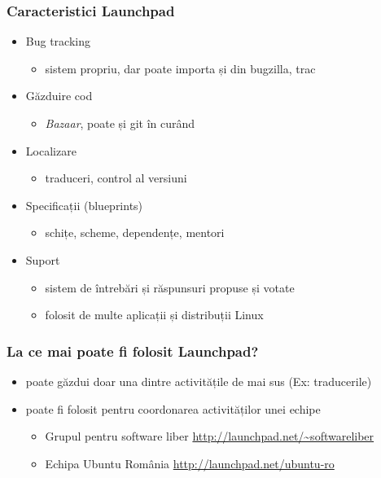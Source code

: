 \documentclass{beamer}
\begin{document}
\begin{frame}
\frametitle{Caracteristici Launchpad}
\begin{itemize}
\pause \item Bug tracking
\begin{itemize}
\item sistem propriu, dar poate importa și din bugzilla, trac
\end{itemize}
\pause \item Găzduire cod 
\begin{itemize}
\item	\emph{Bazaar}, poate și git în curând
\end{itemize}
\pause \item Localizare
\begin{itemize}
\item traduceri, control al versiuni
\end{itemize}
\pause \item Specificații (blueprints)
\begin{itemize}
\item schițe, scheme, dependențe, mentori
\end{itemize}
\pause \item Suport
\begin{itemize}
\item sistem de întrebări și răspunsuri propuse și votate
\newline
\item folosit de multe aplicații și distribuții Linux %
\end{itemize}
\end{itemize}
\end{frame}

\begin{frame}
\frametitle{La ce mai poate fi folosit Launchpad?}
\begin{itemize}
\item poate găzdui doar una dintre activitățile de mai sus (Ex: traducerile)
\item poate fi folosit pentru coordonarea activităților unei echipe
\begin{itemize}
\item Grupul pentru software liber \url{http://launchpad.net/~softwareliber}
\item Echipa Ubuntu România \url{http://launchpad.net/ubuntu-ro}
\end{itemize}
\end{itemize}
\end{frame}
\end{document}
